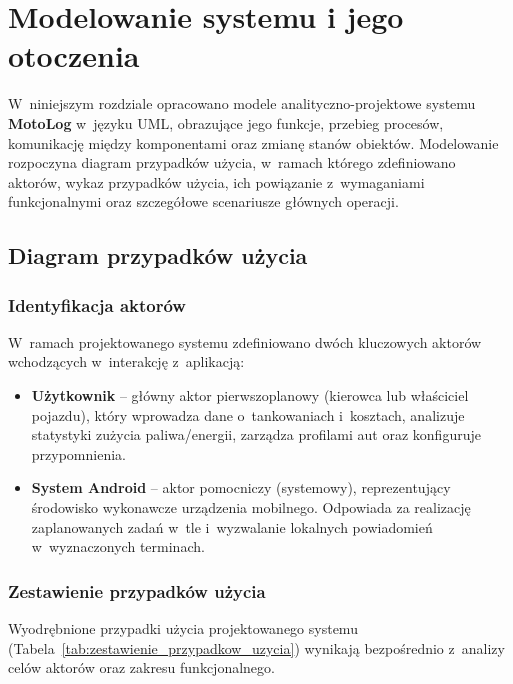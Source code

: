 ﻿\chapter{Modelowanie systemu i jego otoczenia}
\label{cha:modelowanie_systemu}

W~niniejszym rozdziale opracowano modele analityczno-projektowe systemu \textbf{MotoLog} w~języku UML, obrazujące jego funkcje, przebieg procesów, komunikację między komponentami oraz zmianę stanów obiektów. Modelowanie rozpoczyna diagram przypadków użycia, w~ramach którego zdefiniowano aktorów, wykaz przypadków użycia, ich powiązanie z~wymaganiami funkcjonalnymi oraz szczegółowe scenariusze głównych operacji.

\section{Diagram przypadków użycia}
\label{sec:diagram_przypadkow_uzycia}

\subsection{Identyfikacja aktorów}
\label{subsec:identyfikacja_aktorow}

W~ramach projektowanego systemu zdefiniowano dwóch kluczowych aktorów wchodzących w~interakcję z~aplikacją:

\begin{itemize}
    \item \textbf{Użytkownik} -- główny aktor pierwszoplanowy (kierowca lub właściciel pojazdu), który wprowadza dane o~tankowaniach i~kosztach, analizuje statystyki zużycia paliwa/energii, zarządza profilami aut oraz konfiguruje przypomnienia.
    \item \textbf{System Android} -- aktor pomocniczy (systemowy), reprezentujący środowisko wykonawcze urządzenia mobilnego. Odpowiada za realizację zaplanowanych zadań w~tle i~wyzwalanie lokalnych powiadomień w~wyznaczonych terminach.
\end{itemize}

\subsection{Zestawienie przypadków użycia}
\label{subsec:zestawienie_przypadkow_uzycia}

Wyodrębnione przypadki użycia projektowanego systemu (Tabela~\ref{tab:zestawienie_przypadkow_uzycia}) wynikają bezpośrednio z~analizy celów aktorów oraz zakresu funkcjonalnego.


